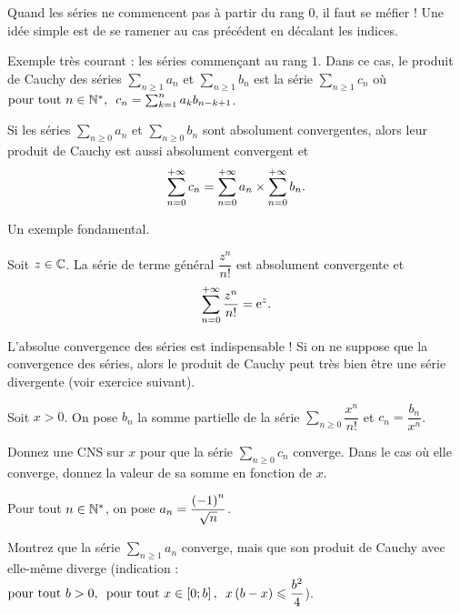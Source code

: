 \begin{rem}
Quand les séries ne commencent pas à partir du rang \(0\), il faut se méfier ! Une idée simple est de se ramener au cas précédent en décalant les indices.

Exemple très courant : les séries commençant au rang \(1\). Dans ce cas, le produit de Cauchy des séries \(\sum_{n\geq1}a_n\) et \(\sum_{n\geq1}b_n\) est la série \(\sum_{n\geq1}c_n\) où \(\quantifs{\tpt n\in\Ns}c_n=\sum_{k=1}^na_kb_{n-k+1}\).
\end{rem}

\begin{theo}
Si les séries \(\sum_{n\geq0}a_n\) et \(\sum_{n\geq0}b_n\) sont absolument convergentes, alors leur produit de Cauchy est aussi absolument convergent et \[\sum_{n=0}^{+\infty}c_n=\sum_{n=0}^{+\infty}a_n\times\sum_{n=0}^{+\infty}b_n.\]
\end{theo}

Un exemple fondamental.

\begin{prop}
Soit \(z\in\mathbb{C}\). La série de terme général \(\dfrac{z^n}{n!}\) est absolument convergente et \[\sum_{n=0}^{+\infty}\dfrac{z^n}{n!}=\mathrm{e}^{z}.\]
\end{prop}

\begin{rem}
L'absolue convergence des séries est indispensable ! Si on ne suppose que la convergence des séries, alors le produit de Cauchy peut très bien être une série divergente (voir exercice suivant).
\end{rem}

\begin{exo}
Soit \(x>0\). On pose \(b_n\) la somme partielle de la série \(\sum_{n\geq0}\dfrac{x^n}{n!}\) et \(c_n=\dfrac{b_n}{x^n}\).

Donnez une CNS sur \(x\) pour que la série \(\sum_{n\geq0}c_n\) converge. Dans le cas où elle converge, donnez la valeur de sa somme en fonction de \(x\).
\end{exo}

\begin{exo}
Pour tout \(n\in\mathbb{N}^*\), on pose \(a_n=\dfrac{\left(-1\right)^n}{\sqrt{n}}\).

Montrez que la série \(\sum_{n\geq1}a_n\) converge, mais que son produit de Cauchy avec elle-même diverge (indication : \(\quantifs{\tpt b>0;\tpt x\in\intervii{0}{b}}x\paren{b-x}\leq\dfrac{b^2}{4}\)).
\end{exo}
